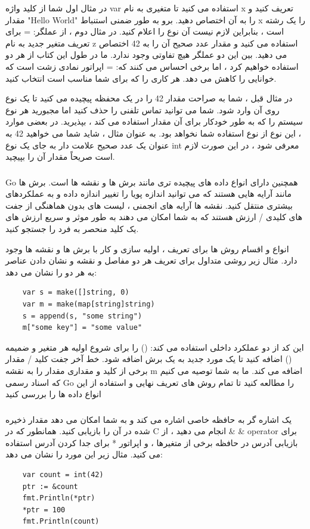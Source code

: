 \documentclass[12pt]{book}
\begin{document}
در مثال اول شما از کلید واژه var استفاده می کنید تا متغیری به نام x تعریف کنید و مقدار "Hello World" را به آن اختصاص دهید. برو به طور ضمنی استنباط x را یک رشته است ، بنابراین لازم نیست آن نوع را اعلام کنید. در مثال دوم ، از عملگر: = برای تعریف متغیر جدید به نام z استفاده می کنید و مقدار عدد صحیح آن را به 42 اختصاص می دهید. بین این دو عملگر هیچ تفاوتی وجود ندارد. ما در طول این کتاب از هر دو استفاده خواهیم کرد ، اما برخی احساس می کنند که: = اپراتور نمادی زشت است که خوانایی را کاهش می دهد. هر کاری را که برای شما مناسب است انتخاب کنید.

در مثال قبل ، شما به صراحت مقدار 42 را در یک محفظه پیچیده می کنید تا یک نوع روی آن وارد شود. شما می توانید تماس تلفنی را حذف کنید اما مجبورید هر نوع سیستم را که به طور خودکار برای آن مقدار استفاده می کند ، بپذیرید. در بعضی موارد ، این نوع از نوع استفاده شما نخواهد بود. به عنوان مثال ، شاید شما می خواهید 42 به عنوان یک عدد صحیح علامت دار به جای یک نوع int معرفی شود ، در این صورت لازم است صریحاً مقدار آن را بپیچید.


\subsubsection{}
Go همچنین دارای انواع داده های پیچیده تری مانند برش ها و نقشه ها است. برش ها مانند آرایه هایی هستند که می توانید اندازه پویا را تغییر اندازه داده و به عملکردهای بیشتری منتقل کنید. نقشه ها آرایه های انجمنی ، لیست های بدون هماهنگی از جفت های کلیدی / ارزش هستند که به شما امکان می دهند به طور موثر و سریع ارزش های یک کلید منحصر به فرد را جستجو کنید.

انواع و اقسام روش ها برای تعریف ، اولیه سازی و کار با برش ها و نقشه ها وجود دارد. مثال زیر روشی متداول برای تعریف هر دو مفاصل و نقشه و نشان دادن عناصر به هر دو را نشان می دهد:
\begin{latin}
	\begin{lstlisting}
	var s = make([]string, 0)
	var m = make(map[string]string)
	s = append(s, "some string")
	m["some key"] = "some value"
	\end{lstlisting}
\end{latin}

این کد از دو عملکرد داخلی استفاده می کند: () را برای شروع اولیه هر متغیر و ضمیمه () اضافه کنید تا یک مورد جدید به یک برش اضافه شود. خط آخر جفت کلید / مقدار برخی از کلید و مقداری مقدار را به نقشه m اضافه می کند. ما به شما توصیه می كنیم كه اسناد رسمی Go را مطالعه كنید تا تمام روش های تعریف نهایی و استفاده از این انواع داده ها را بررسی كنید
\subsubsection{}
یک اشاره گر به حافظه خاصی اشاره می کند و به شما امکان می دهد مقدار ذخیره شده در آن را بازیابی کنید. همانطور که در C انجام می دهید ، از \& \& operator برای بازیابی آدرس در حافظه برخی از متغیرها ، و اپراتور * برای جدا کردن آدرس استفاده می کنید. مثال زیر این مورد را نشان می دهد:
\begin{latin}
	\begin{lstlisting}
	var count = int(42)
	ptr := &count
	fmt.Println(*ptr)
	*ptr = 100
	fmt.Println(count)
	\end{lstlisting}
\end{latin}
\end{document}

